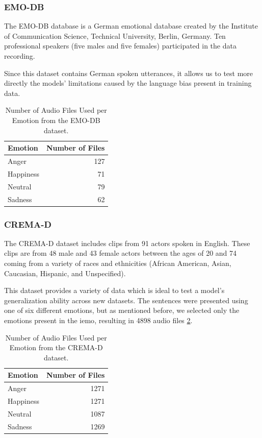 \subsubsection{EMO-DB}

The EMO-DB database is a German emotional database created by the Institute of Communication Science, Technical University, Berlin, Germany. Ten professional speakers (five males and five females) participated in the data recording.

Since this dataset contains German spoken utterances, it allows us to test more directly the models' limitations caused by the language bias present in training data.

\begin{table}[H]
	\centering
	\label{tab:emo_files}
	\caption{Number of Audio Files Used per Emotion from the EMO-DB dataset.}
	\begin{tabular}{lr}
		\toprule
		Emotion     &   Number of Files \\
		\midrule
		Anger   	&               127 \\
		Happiness   &                71 \\
		Neutral		&                79 \\
		Sadness     &                62 \\
		\bottomrule
	\end{tabular}
\end{table}


\subsubsection{CREMA-D}


The CREMA-D dataset includes clips from 91 actors spoken in English. These clips are from 48 male and 43 female actors between the ages of 20 and 74 coming from a variety of races and ethnicities (African American, Asian, Caucasian, Hispanic, and Unspecified).

This dataset provides a variety of data which is ideal to test a model's generalization ability across new datasets. The sentences were presented using one of six different emotions, but as mentioned before, we selected only the emotions present in the \ac{iemo}, resulting in 4898 audio files \ref{tab:crema_files}. 

\begin{table}[H]
	\centering
	\label{tab:crema_files}
	\caption{Number of Audio Files Used per Emotion from the CREMA-D dataset.}
	\begin{tabular}{lr}
		\toprule
		Emotion     &   Number of Files \\
		\midrule
		Anger   	&              1271 \\
		Happiness   &              1271 \\
		Neutral 	&              1087 \\
		Sadness     &              1269 \\
		\bottomrule
	\end{tabular}
\end{table}


